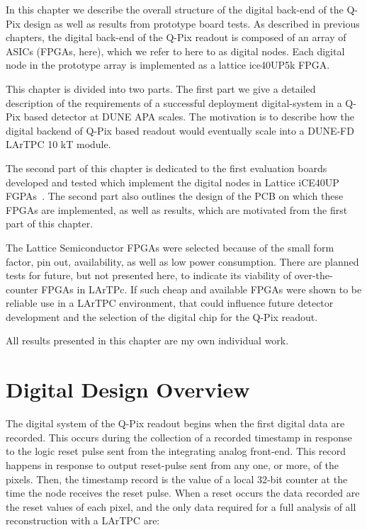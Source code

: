 In this chapter we describe the overall structure of the digital back-end of the Q-Pix design as well as results from prototype board tests.
As described in previous chapters, the digital back-end of the Q-Pix readout is composed of an array of ASICs (FPGAs, here), which we refer to here to as digital nodes.
Each digital node in the prototype array is implemented as a lattice ice40UP5k FPGA.

This chapter is divided into two parts.
The first part we give a detailed description of the requirements of a successful deployment digital-system in a Q-Pix based detector at DUNE APA scales.
The motivation is to describe how the digital backend of Q-Pix based readout would eventually scale into a DUNE-FD LArTPC 10 kT module.

The second part of this chapter is dedicated to the first evaluation boards developed and tested which implement the digital nodes in Lattice iCE40UP FGPAs~\citep{lattice_ice40up_datasheet}.
The second part also outlines the design of the PCB on which these FPGAs are implemented, as well as results, which are motivated from the first part of this chapter.

The Lattice Semiconductor FPGAs \citep{lattice_ice40up_datasheet} were selected because of the small form factor, pin out, availability, as well as low power consumption.
There are planned tests for future, but not presented here, to indicate its viability of over-the-counter FPGAs in LArTPc.
If such cheap and available FPGAs were shown to be reliable use in a LArTPC environment, that could influence future detector development and the selection of the digital chip for the Q-Pix readout.

All results presented in this chapter are my own individual work.

\section{Digital Design Overview}

The digital system of the Q-Pix readout begins when the first digital data are recorded.
This occurs during the collection of a recorded timestamp in response to the logic reset pulse sent from the integrating analog front-end.
This record happens in response to output reset-pulse sent from any one, or more, of the pixels.
Then, the timestamp record is the value of a local 32-bit counter at the time the node receives the reset pulse.
When a reset occurs the data recorded are the reset values of each pixel, and the only data required for a full analysis of all reconstruction with a LArTPC are:

